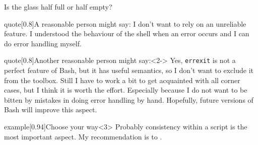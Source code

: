 \begin{frame}{Is the glass half full or half empty?}
    \vspace{-1mm}
    \begin{varblock}{quote}[0.8\textwidth]{A reasonable person might say:}
        I don't want to rely on an unreliable feature.
        I understood the behaviour of the shell when an error occurs and I can do error handling myself.
    \end{varblock}
    \begin{varblock}{quote}[0.8\textwidth]{Another reasonable person might say:}<2->
        Yes, \texttt{errexit} is not a perfect feature of Bash, but it has useful semantics, so I don't want to exclude it from the toolbox.
        Still I have to work a bit to get acquainted with all corner cases, but I think it is worth the effort.
        Especially because I do not want to be bitten by mistakes in doing error handling by hand.
        Hopefully, future versions of Bash will improve this aspect.
    \end{varblock}
    \begin{varblock}{example}[0.94\textwidth]{Choose your way}<3>
        Probably consistency within a script is the most important aspect.
        My recommendation is to .
    \end{varblock}
    \PrepareURLsymbol[PB]
\end{frame}

